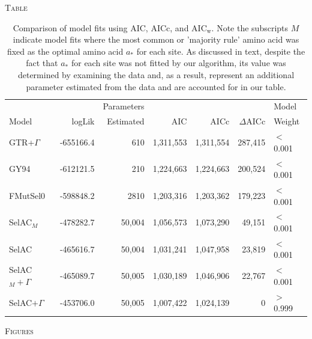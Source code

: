 \documentclass[12pt,letterpaper]{article}
\renewcommand{\section}[1]{%
\bigskip
\begin{center}
\begin{Large}
\normalfont\scshape #1
\medskip
\end{Large}
\end{center}}
\newcommand{\DeltaAICc}{\ensuremath{\Delta\text{AICc}}\xspace}
\newcommand{\AICw}{\ensuremath{\text{AIC}_\text{w}}\xspace}
\newcommand{\selac}{SelAC\xspace}
\newcommand{\selacplusgamma}{SelAC$+\Gamma$\xspace}
\newcommand{\selacmaj}{SelAC$_{M}$\xspace}
\newcommand{\selacmajplusgamma}{SelAC$_{M}+\Gamma$\xspace}
\newcommand{\aopt}{\ensuremath{a_*}\xspace}
\begin{document}
\clearpage

\section{Table}

  \begin{table}[H]
    \begin{tabular}{lrrrrrl}
                				&		   &Parameters &              &              &            &    Model\\
      Model                 	& logLik   & Estimated &           AIC&          AICc&  \DeltaAICc&  Weight\\\hline
      GTR+$\Gamma$        		& -655166.4&        610& 	 1,311,553& 	1,311,554&     287,415&	$<$0.001\\
      GY94                  	& -612121.5&        210& 	 1,224,663& 	1,224,663&     200,524&	$<$0.001\\
      FMutSel0              	& -598848.2&       2810& 	 1,203,316& 	1,203,362&     179,223&	$<$0.001\\
      \selacmaj          	    & -478282.7&       50,004&   1,056,573&     1,073,290&      49,151&	$<$0.001\\
      \selac                    & -465616.7&       50,004&   1,031,241&     1,047,958&      23,819&	$<$0.001\\
      \selacmajplusgamma 	    & -465089.7&       50,005&   1,030,189&     1,046,906&      22,767& $<$0.001\\
      \selacplusgamma 	        & -453706.0&       50,005&   1,007,422&     1,024,139&           0& $>$0.999\\
    \end{tabular}
    \caption{Comparison of model fits using AIC, AICc, and \AICw.
Note the subscripts $M$ indicate model fits where the most common or 'majority rule' amino acid was fixed as the optimal amino acid \aopt for each site.  
As discussed in text, despite the fact that \aopt for each site was not fitted by our algorithm, its value was determined by examining the data and, as a result, represent an additional parameter estimated from the data and are accounted for in our table.
}
    \label{table:modelFits}
\end{table}



\clearpage %

\section{Figures}
\end{document}
